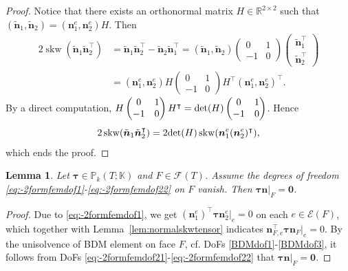 \documentclass[10pt]{amsart}
\newtheorem{lemma}[theorem]{Lemma}
\newcommand{\skw}{\operatorname{skw}}
\numberwithin{equation}{section}
\begin{document}
\begin{proof}
Notice that there exists an orthonormal matrix $H\in\mathbb R^{2\times2}$ such that 
$(\tilde{\boldsymbol{n}}_1, \tilde{\boldsymbol{n}}_2)=(\boldsymbol{n}_1^e, \boldsymbol{n}_2^e)H$.
Then
\begin{align*}
2\skw(\tilde{\boldsymbol{n}}_1\tilde{\boldsymbol{n}}_2^{\intercal})&=\tilde{\boldsymbol{n}}_1\tilde{\boldsymbol{n}}_2^{\intercal}-\tilde{\boldsymbol{n}}_2\tilde{\boldsymbol{n}}_1^{\intercal}=(\tilde{\boldsymbol{n}}_1, \tilde{\boldsymbol{n}}_2)\begin{pmatrix}
0 & 1 \\
-1 & 0
\end{pmatrix}\begin{pmatrix}
\tilde{\boldsymbol{n}}_1^{\intercal} \\
\tilde{\boldsymbol{n}}_2^{\intercal}  
\end{pmatrix}
\\
&=(\boldsymbol{n}_1^e, \boldsymbol{n}_2^e)H\begin{pmatrix}
0 & 1 \\
-1 & 0
\end{pmatrix}H^{\intercal}(\boldsymbol{n}_1^e, \boldsymbol{n}_2^e)^{\intercal}.
\end{align*}
By a direct computation, $H\begin{pmatrix}
0 & 1 \\
-1 & 0
\end{pmatrix}H^{\intercal}={\rm det}(H)\begin{pmatrix}
0 & 1 \\
-1 & 0
\end{pmatrix}$. Hence
\[
2\skw(\tilde{\boldsymbol{n}}_1\tilde{\boldsymbol{n}}_2^{\intercal})=2{\rm det}(H)\skw(\boldsymbol{n}_1^e(\boldsymbol{n}_2^e)^{\intercal}),
\]
which ends the proof.
\end{proof}

\begin{lemma}\label{lem:-2formfemfaceunisolvence}
Let $\boldsymbol{\tau}\in\mathbb P_k(T;\mathbb K)$ and $F\in\mathcal F(T)$.
Assume the degrees of freedom \eqref{eq:-2formfemdof1}-\eqref{eq:-2formfemdof22} on $F$ vanish. 
Then $\boldsymbol{\tau}\boldsymbol{n}|_F=\boldsymbol{0}$.
\end{lemma}
\begin{proof}
Due to \eqref{eq:-2formfemdof1},  we get $(\boldsymbol{n}_1^e)^{\intercal}\boldsymbol{\tau}\boldsymbol{n}_2^e|_e=0$ on each $e\in\mathcal E(F)$, which together with Lemma~\ref{lem:normalskwtensor} indicates $\boldsymbol{n}_{F,e}^{\intercal}\boldsymbol{\tau}\boldsymbol{n}_F|_e=0$. By the unisolvence of BDM element on face $F$, cf. DoFs \eqref{BDMdof1}-\eqref{BDMdof3}, it follows from DoFs \eqref{eq:-2formfemdof21}-\eqref{eq:-2formfemdof22} that $\boldsymbol{\tau}\boldsymbol{n}|_F=\boldsymbol{0}$.
\end{proof}
\end{document}
